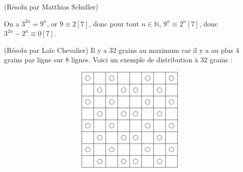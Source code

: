 \begin{sol}[1](Résolu par Matthias Schuller)

On a $3^{2n}=9^n$,
or $9 \equiv 2 [7]$,
donc pour tout $n \in \mathbb{N}$, $9^n \equiv 2^n [7]$,
donc $3^{2n}-2^n \equiv 0 [7]$.

\end{sol}

\begin{sol}[5](R\'esolu par Lo\"ic Chevalier)
Il y a 32 grains au maximum car il y a au plus 4 grains par ligne sur 8 lignes. Voici un exemple de distribution \`a 32 grains :

\[\begin{tikzpicture}[scale=0.3]
\draw (0, 0)--(0,16);
\draw (2, 0)--(2,16);
\draw (4, 0)--(4,16);
\draw (6, 0)--(6,16);
\draw (8, 0)--(8,16);
\draw (10, 0)--(10,16);
\draw (12, 0)--(12,16);
\draw (14, 0)--(14,16);
\draw (16, 0)--(16,16);

\draw (0,0)--(16,0);
\draw (0,2)--(16,2);
\draw (0,4)--(16,4);
\draw (0,6)--(16,6);
\draw (0,8)--(16,8);
\draw (0,10)--(16,10);
\draw (0,12)--(16,12);
\draw (0,14)--(16,14);
\draw (0,16)--(16,16);

\draw (1,15) circle (0.4);
\draw (1,11) circle (0.4);
\draw (1,7) circle (0.4);
\draw (1,3) circle (0.4);
\draw (3,13) circle (0.4);
\draw (3,9) circle (0.4);
\draw (3,5) circle (0.4);
\draw (3,1) circle (0.4);

\draw (5,15) circle (0.4);
\draw (5,11) circle (0.4);
\draw (5,7) circle (0.4);
\draw (5,3) circle (0.4);
\draw (7,13) circle (0.4);
\draw (7,9) circle (0.4);
\draw (7,5) circle (0.4);
\draw (7,1) circle (0.4);


\draw (11,15) circle (0.4);
\draw (11,11) circle (0.4);
\draw (11,7) circle (0.4);
\draw (11,3) circle (0.4);
\draw (9,13) circle (0.4);
\draw (9,9) circle (0.4);
\draw (9,5) circle (0.4);
\draw (9,1) circle (0.4);

\draw (15,15) circle (0.4);
\draw (15,11) circle (0.4);
\draw (15,7) circle (0.4);
\draw (15,3) circle (0.4);
\draw (13,13) circle (0.4);
\draw (13,9) circle (0.4);
\draw (13,5) circle (0.4);
\draw (13,1) circle (0.4);


\end{tikzpicture}\]
\end{sol}

